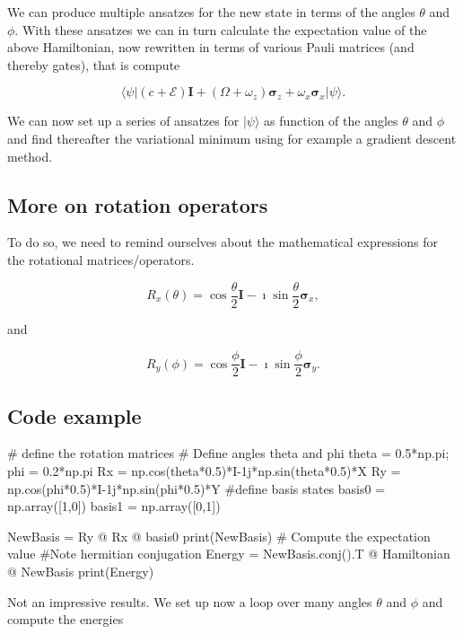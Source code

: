 \documentclass[%
oneside,                 %
final,                   %
10pt]{article}
\begin{document}
We can produce multiple ansatzes for the new state in terms of the
angles $\theta$ and $\phi$.  With these ansatzes we can in turn
calculate the expectation value of the above Hamiltonian, now
rewritten in terms of various Pauli matrices (and thereby gates), that is compute

\[
\langle \psi \vert (c+\mathcal{E})\bm{I} + (\Omega+\omega_z)\bm{\sigma}_z + \omega_x\bm{\sigma}_x\vert \psi \rangle.
\]

We can now set up a series of ansatzes for $\vert \psi \rangle$ as
function of the angles $\theta$ and $\phi$ and find thereafter the
variational minimum using for example a gradient descent method.

\subsection{More on rotation operators}

To do so, we need to remind ourselves about the mathematical expressions for
the rotational matrices/operators.

\[
R_x(\theta)=\cos{\frac{\theta}{2}}\bm{I}-\imath \sin{\frac{\theta}{2}}\bm{\sigma}_x,
\]

and

\[
R_y(\phi)=\cos{\frac{\phi}{2}}\bm{I}-\imath \sin{\frac{\phi}{2}}\bm{\sigma}_y.
\]

\subsection{Code example}

















\bpycod
# define the rotation matrices
# Define angles theta and phi
theta = 0.5*np.pi; phi = 0.2*np.pi
Rx = np.cos(theta*0.5)*I-1j*np.sin(theta*0.5)*X
Ry = np.cos(phi*0.5)*I-1j*np.sin(phi*0.5)*Y
#define basis states
basis0 = np.array([1,0])
basis1 = np.array([0,1])

NewBasis = Ry @ Rx @ basis0
print(NewBasis)
# Compute the expectation value
#Note hermitian conjugation
Energy = NewBasis.conj().T @ Hamiltonian @ NewBasis
print(Energy)

\epycod

Not an impressive results. We set up now a loop over many angles $\theta$ and $\phi$ and compute the energies
\end{document}
